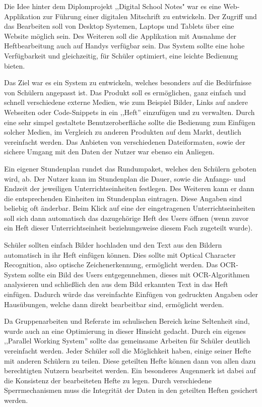 Die Idee hinter dem Diplomprojekt ,,Digital School Notes" war es eine Web-Applikation zur Führung einer digitalen Mitschrift zu entwickeln. Der Zugriff und das Bearbeiten soll von Desktop Systemen, Laptops und Tablets über eine Website möglich sein. Des Weiteren soll die Applikation mit Ausnahme der Heftbearbeitung auch auf Handys verfügbar sein. Das System sollte eine hohe Verfügbarkeit und gleichzeitig, für Schüler optimiert, eine leichte Bedienung bieten. 

Das Ziel war es ein System zu entwickeln, welches besonders auf die Bedürfnisse von Schülern angepasst ist. Das Produkt soll es ermöglichen, ganz einfach und schnell verschiedene externe Medien, wie zum Beispiel Bilder, Links auf andere Webseiten oder Code-Snippets in ein ,,Heft'' einzufügen und zu verwalten. Durch eine sehr simpel gestaltete Benutzeroberfläche sollte die Bedienung zum Einfügen solcher Medien, im Vergleich zu anderen Produkten auf dem Markt, deutlich vereinfacht werden. Das Anbieten von verschiedenen Dateiformaten, sowie der sichere Umgang mit den Daten der Nutzer war ebenso ein Anliegen.

Ein eigener Stundenplan rundet das Rundumpaket, welches den Schülern geboten wird, ab. Der Nutzer kann im Stundenplan die Dauer, sowie die Anfangs- und Endzeit der jeweiligen Unterrichtseinheiten festlegen. Des Weiteren kann er dann die entsprechenden Einheiten im Stundenplan eintragen. Diese Angaben sind beliebig oft änderbar. Beim Klick auf eine der eingetragenen Unterrichtseinheiten soll sich dann automatisch das dazugehörige Heft des Users öffnen (wenn zuvor ein Heft dieser Unterrichtseinheit beziehungsweise diesem Fach zugeteilt wurde).

Schüler sollten einfach Bilder hochladen und den Text aus den Bildern automatisch in ihr Heft einfügen können. Dies sollte mit Optical Character Recognition, also optische Zeichenerkennung, ermöglicht werden. Das OCR-System sollte ein Bild des Users entgegennehmen, dieses mit OCR-Algorithmen analysieren und schließlich den aus dem Bild erkannten Text in das Heft einfügen.
Dadurch würde das vereinfachte Einfügen von gedruckten Angaben oder Hausübungen, welche dann direkt bearbeitbar sind, ermöglicht werden.

Da Gruppenarbeiten und Referate im schulischen Bereich keine Seltenheit sind, wurde auch an eine Optimierung in dieser Hinsicht gedacht. Durch ein eigenes ,,Parallel Working System'' sollte das gemeinsame Arbeiten für Schüler deutlich vereinfacht werden. Jeder Schüler soll die Möglichkeit haben, einige seiner Hefte mit anderen Schülern zu teilen. Diese geteilten Hefte können dann von allen dazu berechtigten Nutzern bearbeitet werden. Ein besonderes Augenmerk ist dabei auf die Konsistenz der bearbeiteten Hefte zu legen. Durch verschiedene Sperrmechanismen muss die Integrität der Daten in den geteilten Heften gesichert werden.

